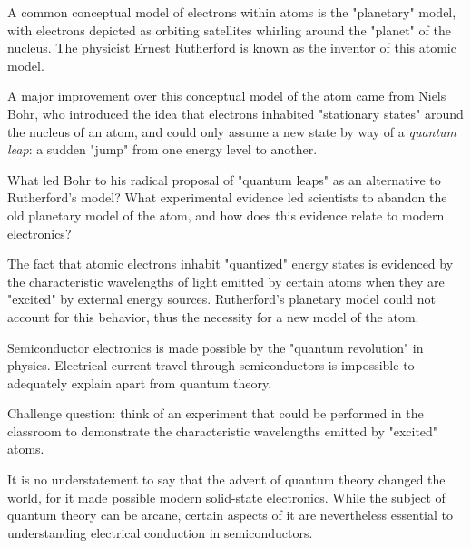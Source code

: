 

A common conceptual model of electrons within atoms is the "planetary" model, with electrons depicted as orbiting satellites whirling around the "planet" of the nucleus.  The physicist Ernest Rutherford is known as the inventor of this atomic model.  

A major improvement over this conceptual model of the atom came from Niels Bohr, who introduced the idea that electrons inhabited "stationary states" around the nucleus of an atom, and could only assume a new state by way of a {\it quantum leap}: a sudden "jump" from one energy level to another.

What led Bohr to his radical proposal of "quantum leaps" as an alternative to Rutherford's model?  What experimental evidence led scientists to abandon the old planetary model of the atom, and how does this evidence relate to modern electronics?







The fact that atomic electrons inhabit "quantized" energy states is evidenced by the characteristic wavelengths of light emitted by certain atoms when they are "excited" by external energy sources.  Rutherford's planetary model could not account for this behavior, thus the necessity for a new model of the atom.  

Semiconductor electronics is made possible by the "quantum revolution" in physics.  Electrical current travel through semiconductors is impossible to adequately explain apart from quantum theory.

\vskip 10pt

Challenge question: think of an experiment that could be performed in the classroom to demonstrate the characteristic wavelengths emitted by "excited" atoms.







It is no understatement to say that the advent of quantum theory changed the world, for it made possible modern solid-state electronics.  While the subject of quantum theory can be arcane, certain aspects of it are nevertheless essential to understanding electrical conduction in semiconductors.  

